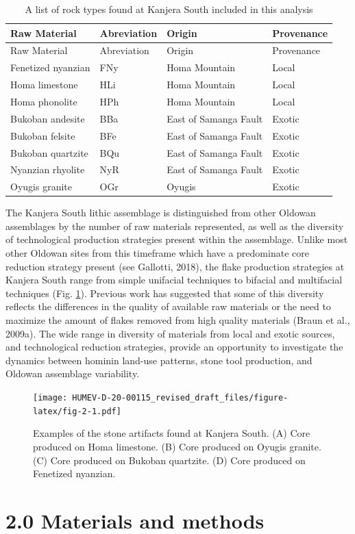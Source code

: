 \documentclass[]{elsarticle} %
\begin{document}
\begin{longtable}[]{@{}llll@{}}
\caption{A list of rock types found at Kanjera South included in this
analysis \label{table1}}\tabularnewline
\toprule
Raw Material & Abreviation & Origin & Provenance\tabularnewline
\midrule
\endfirsthead
\toprule
Raw Material & Abreviation & Origin & Provenance\tabularnewline
\midrule
\endhead
Fenetized nyanzian & FNy & Homa Mountain & Local\tabularnewline
Homa limestone & HLi & Homa Mountain & Local\tabularnewline
Homa phonolite & HPh & Homa Mountain & Local\tabularnewline
Bukoban andesite & BBa & East of Samanga Fault & Exotic\tabularnewline
Bukoban felsite & BFe & East of Samanga Fault & Exotic\tabularnewline
Bukoban quartzite & BQu & East of Samanga Fault & Exotic\tabularnewline
Nyanzian rhyolite & NyR & East of Samanga Fault & Exotic\tabularnewline
Oyugis granite & OGr & Oyugis & Exotic\tabularnewline
\bottomrule
\end{longtable}

The Kanjera South lithic assemblage is distinguished from other Oldowan
assemblages by the number of raw materials represented, as well as the
diversity of technological production strategies present within the
assemblage. Unlike most other Oldowan sites from this timeframe which
have a predominate core reduction strategy present (see Gallotti, 2018),
the flake production strategies at Kanjera South range from simple
unifacial techniques to bifacial and multifacial techniques (Fig.
\ref{tools}). Previous work has suggested that some of this diversity
reflects the differences in the quality of available raw materials or
the need to maximize the amount of flakes removed from high quality
materials (Braun et al., 2009a). The wide range in diversity of
materials from local and exotic sources, and technological reduction
strategies, provide an opportunity to investigate the dynamics between
hominin land-use patterns, stone tool production, and Oldowan assemblage
variability.

\begin{figure}
\centering
\texttt{[image: HUMEV-D-20-00115\_revised\_draft\_files/figure-latex/fig-2-1.pdf]}
\caption{Examples of the stone artifacts found at Kanjera South. (A)
Core produced on Homa limestone. (B) Core produced on Oyugis granite.
(C) Core produced on Bukoban quartzite. (D) Core produced on Fenetized
nyanzian. \label{tools}}
\end{figure}

\hypertarget{materials-and-methods}{%
\section{2.0 Materials and methods}\label{materials-and-methods}}
\end{document}
